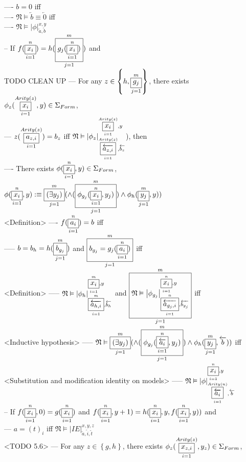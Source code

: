 \documentclass{book}
\newcommand{\is}{:\equiv}
\newcommand{\set}[1]{\left\{ #1 \right\}}
\newcommand{\vdc}[3]{\underset{#2}{\overset{#3}{\fbox{$#1$}}}}
\newcommand{\sub}[3]{\left|#1\right|_{#3}^{#2}}
\begin{document}
				---- $b = 0$ iff \\
				---- $\mathfrak{N} \vDash \overleftarrow{b} \equiv \overleftarrow{0}$ iff \\
			---- $\mathfrak{N} \vDash \sub{\phi}{x, y}{\overleftarrow{a}, \overleftarrow{b}}$ \\
		-- If $f(\vdc{x_i}{i=1}{n}) = h(\vdc{g_j(\vdc{x_i}{i=1}{n})}{j=1}{m})$ and \\ TODO CLEAN UP
			--- For any $z \in \set{h, \vdc{g_j}{j=1}{m}}$, there exists $\phi_z(\vdc{x_i}{i=1}{Arity(z)}, y) \in \Sigma_{Form}$, \\
			--- $z(\vdc{a_{z, i}}{i=1}{Arity(z)}) = b_z$ iff $\mathfrak{N} \vDash \sub{\phi_z}{\vdc{x_i}{i=1}{Arity(z)}, y}{\vdc{\overleftarrow{a_{z, i}}}{i=1}{Arity(z)}, \overleftarrow{b_z}}$), then \\
				---- There exists $\phi(\vdc{x_i}{i=1}{n}, y) \in \Sigma_{Form}$, $\phi(\vdc{x_i}{i=1}{n}, y) \is \vdc{(\exists y_j)}{j=1}{m}(\land(\vdc{\phi_{g_j}(\vdc{x_i}{i=1}{n}, y_j)}{j=1}{m}) \land \phi_h(\vdc{y_j}{j=1}{m}, y))$ \\ <Definition>
				---- $f(\vdc{a_i}{i=1}{n}) = b$ iff \\
					----- $b = b_h = h(\vdc{b_{g_j}}{j=1}{m})$ and $\vdc{b_{g_j} = g_j(\vdc{a_i}{i=1}{n})}{j=1}{m}$ iff \\ <Definition>
					----- $\mathfrak{N} \vDash \sub{\phi_{h}}{\vdc{x_i}{i=1}{m}, y}{\vdc{\overleftarrow{a_{h, i}}}{i=1}{m}, \overleftarrow{b_h}}$ and $\vdc{\mathfrak{N} \vDash \sub{\phi_{g_j}}{\vdc{x_i}{i=1}{n}, y}{\vdc{\overleftarrow{a_{g_j, i}}}{i=1}{n}, \overleftarrow{b_{g_j}}}}{j=1}{m}$ iff \\ <Inductive hypothesis>
					----- $\mathfrak{N} \vDash \vdc{(\exists y_j)}{j=1}{m}(\land(\vdc{\phi_{g_j}(\vdc{\overleftarrow{a_i}}{i=1}{n}, y_j)}{j=1}{m}) \land \phi_h(\vdc{y_j}{j=1}{m}, \overleftarrow{b}))$ iff \\ <Substitution and modification identity on models>
					----- $\mathfrak{N} \vDash \sub{\phi}{\vdc{x_i}{i=1}{n}, y}{\vdc{\overleftarrow{a_i}}{i=1}{Arity(n)}, \overleftarrow{b}}$ \\
		-- If $f(\vdc{x_i}{i=1}{n}, 0) = g(\vdc{x_i}{i=1}{n})$ and $f(\vdc{x_i}{i=1}{n}, y+1) = h(\vdc{x_i}{i=1}{n}, y, f(\vdc{x_i}{i=1}{n}, y))$ and \\
			--- $a = (t)_i$ iff $\mathfrak{N} \vDash \sub{IE}{x, y, z}{\overleftarrow{a}, \overleftarrow{i}, \overleftarrow{t}}$ \\ <TODO 5.6>
			--- For any $z \in \set{g, h}$, there exists $\phi_z(\vdc{x_{z, i}}{i=1}{Arity(z)}, y_z) \in \Sigma_{Form}$, \\
\end{document}
